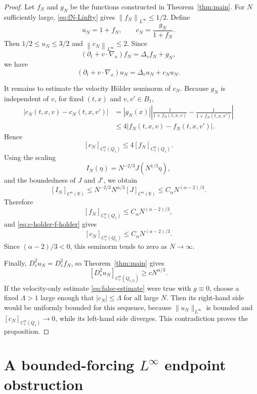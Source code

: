 \documentclass[10pt,a4paper]{amsart}
\numberwithin{equation}{section}
\newcommand{\norm}[1]{\left\|#1\right\|}
\begin{document}
\begin{proof}
Let $f_N$ and $g_N$ be the functions constructed in Theorem~\ref{thm:main}.  For $N$ sufficiently large, \eqref{eq:fN-Linfty} gives $\norm{f_N}_{L^\infty}\le1/2$.  Define
\[
   u_N=1+f_N,
   \qquad
   c_N=\frac{g_N}{1+f_N}.
\]
Then $1/2\le u_N\le3/2$ and $\norm{c_N}_{L^\infty}\le2$.  Since
\[
   (\partial_t+v\cdot\nabla_x)f_N=\Delta_vf_N+g_N,
\]
we have
\[
   (\partial_t+v\cdot\nabla_x)u_N=\Delta_vu_N+c_Nu_N.
\]

It remains to estimate the velocity H\"older seminorm of \(c_N\).
Because \(g_N\) is independent of \(v\), for fixed \((t,x)\) and
\(v,v'\in B_1\),
\[
\begin{aligned}
   |c_N(t,x,v)-c_N(t,x,v')|
   &= |g_N(x)|
      \left|
      \frac1{1+f_N(t,x,v)}
      -
      \frac1{1+f_N(t,x,v')}
      \right|  \\
   &\le 4|f_N(t,x,v)-f_N(t,x,v')|.
\end{aligned}
\]
Hence
\begin{equation}\label{eq:c-holder-f-holder}
   [c_N]_{C_v^\alpha(Q_1)}
   \le 4[f_N]_{C_v^\alpha(Q_1)}.
\end{equation}
Using the scaling
\[
   I_N(\eta)=N^{-2/3}J(N^{1/3}\eta),
\]
and the boundedness of \(J\) and \(J'\), we obtain
\[
   [I_N]_{C^\alpha(\mathbb R)}
   \le N^{-2/3}N^{\alpha/3}[J]_{C^\alpha(\mathbb R)}
   \le C_\alpha N^{(\alpha-2)/3}.
\]
Therefore
\[
   [f_N]_{C_v^\alpha(Q_1)}
   \le C_\alpha N^{(\alpha-2)/3},
\]
and \eqref{eq:c-holder-f-holder} gives
\[
   [c_N]_{C_v^\alpha(Q_1)}
   \le C_\alpha N^{(\alpha-2)/3}.
\]
Since \((\alpha-2)/3<0\), this seminorm tends to zero as \(N\to\infty\).

Finally, $D_v^2u_N=D_v^2f_N$, so Theorem~\ref{thm:main} gives
\[
   [D_v^2u_N]_{C_v^\alpha(Q_{1/2})}\ge cN^{\alpha/3}.
\]
If the velocity-only estimate \eqref{eq:false-estimate} were true with $g\equiv0$, choose a fixed $\Lambda>1$ large enough that $|c_N|\le\Lambda$ for all large $N$.  Then its right-hand side would be uniformly bounded for this sequence, because $\|u_N\|_{L^\infty}$ is bounded and $[c_N]_{C_v^\alpha(Q_1)}\to0$, while its left-hand side diverges.  This contradiction proves the proposition.
\end{proof}


\section{A bounded-forcing \texorpdfstring{$L^\infty$}{L-infinity} endpoint obstruction}\label{sec:Linfty-endpoint}
\end{document}
